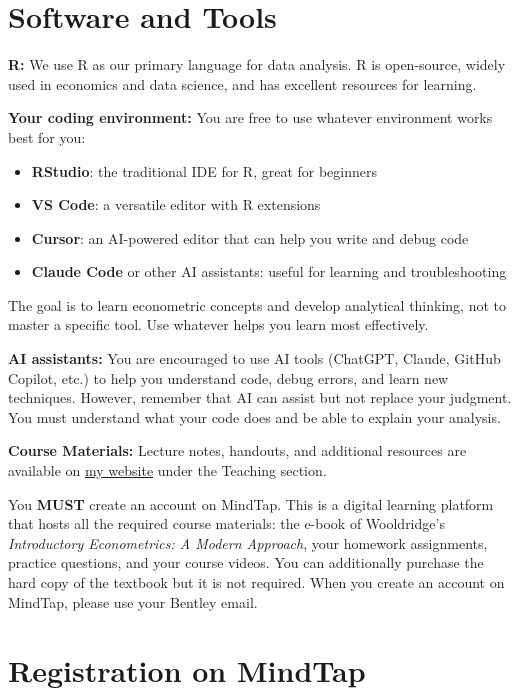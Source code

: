 \documentclass[11pt,letterpaper]{article}
\begin{document}
\section*{Software and Tools}

\textbf{R:} We use R as our primary language for data analysis. R is open-source, widely used in economics and data science, and has excellent resources for learning.

\textbf{Your coding environment:} You are free to use whatever environment works best for you:
\begin{itemize}
    \item \textbf{RStudio}: the traditional IDE for R, great for beginners
    \item \textbf{VS Code}: a versatile editor with R extensions
    \item \textbf{Cursor}: an AI-powered editor that can help you write and debug code
    \item \textbf{Claude Code} or other AI assistants: useful for learning and troubleshooting
\end{itemize}
The goal is to learn econometric concepts and develop analytical thinking, not to master a specific tool. Use whatever helps you learn most effectively.

\textbf{AI assistants:} You are encouraged to use AI tools (ChatGPT, Claude, GitHub Copilot, etc.) to help you understand code, debug errors, and learn new techniques. However, remember that AI can assist but not replace your judgment. You must understand what your code does and be able to explain your analysis.

\textbf{Course Materials:} Lecture notes, handouts, and additional resources are available on \href{https://www.onuraltindag.info/}{my website} under the Teaching section.

You \textbf{MUST} create an account on MindTap. This is a digital learning platform that hosts all the required course materials: the e-book of Wooldridge's \textit{Introductory Econometrics: A Modern Approach}, your homework assignments, practice questions, and your course videos. You can additionally purchase the hard copy of the textbook but it is not required. When you create an account on MindTap, please use your Bentley email.

\section*{Registration on MindTap}
\end{document}
